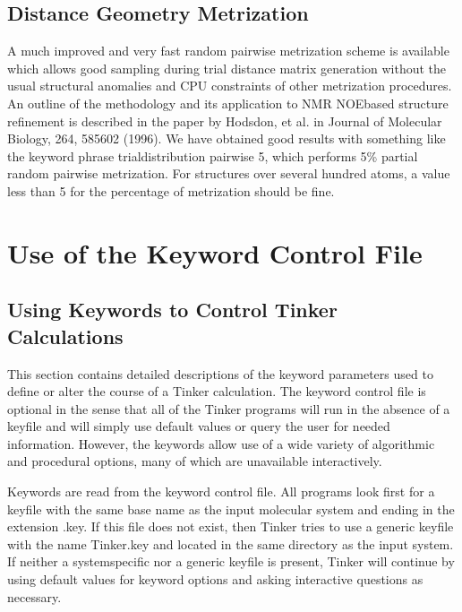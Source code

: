 \documentclass[letterpaper,11pt,english]{sphinxmanual}
\begin{document}
\section{Distance Geometry Metrization}
\label{\detokenize{text/special-features:distance-geometry-metrization}}
A much improved and very fast random pairwise metrization scheme is available which allows good sampling during trial distance matrix generation without the usual structural anomalies and CPU constraints of other metrization procedures. An outline of the methodology and its application to NMR NOE\sphinxhyphen{}based structure refinement is described in the paper by Hodsdon, et al. in Journal of Molecular Biology, 264, 585\sphinxhyphen{}602 (1996). We have obtained good results with something like the keyword phrase trial\sphinxhyphen{}distribution pairwise 5, which performs 5\% partial random pairwise metrization. For structures over several hundred atoms, a value less than 5 for the percentage of metrization should be fine.


\chapter{Use of the Keyword Control File}
\label{\detokenize{text/keywords:use-of-the-keyword-control-file}}\label{\detokenize{text/keywords::doc}}

\section{Using Keywords to Control Tinker Calculations}
\label{\detokenize{text/keywords:using-keywords-to-control-tinker-calculations}}
This section contains detailed descriptions of the keyword parameters used to define or alter the course of a Tinker calculation. The keyword control file is optional in the sense that all of the Tinker programs will run in the absence of a keyfile and will simply use default values or query the user for needed information. However, the keywords allow use of a wide variety of algorithmic and procedural options, many of which are unavailable interactively.

Keywords are read from the keyword control file. All programs look first for a keyfile with the same base name as the input molecular system and ending in the extension .key. If this file does not exist, then Tinker tries to use a generic keyfile with the name Tinker.key and located in the same directory as the input system. If neither a system\sphinxhyphen{}specific nor a generic keyfile is present, Tinker will continue by using default values for keyword options and asking interactive questions as necessary.
\end{document}
